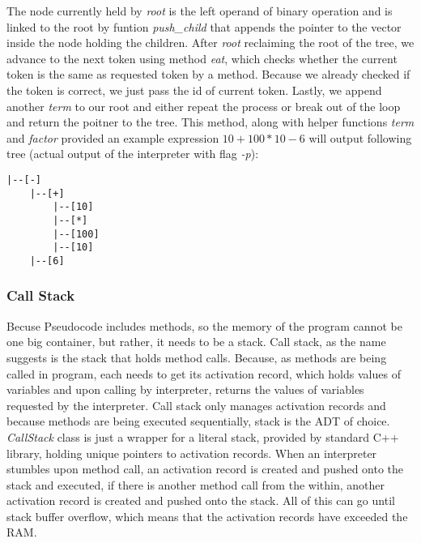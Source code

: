 \documentclass[12pt]{article}
\begin{document}
The node currently held by \emph{root} is the left operand of binary operation and is linked to the root
by funtion \emph{push\_child} that appends the pointer to the vector inside the node holding the children.
After \emph{root} reclaiming the root of the tree, we advance to the next token using method \emph{eat}, which
checks whether the current token is the same as requested token by a method. Because we already checked if the 
token is correct, we just pass the id of current token. Lastly, we append another \emph{term} to our root and
either repeat the process or break out of the loop and return the poitner to the tree. This method, along with 
helper functions \emph{term} and \emph{factor} provided an example expression $10 + 100 * 10 - 6$ will output
following tree (actual output of the interpreter with flag \emph{-p}):
\begin{verbatim}
|--[-]               
    |--[+]        
        |--[10]   
        |--[*]     
        |--[100]
        |--[10] 
    |--[6]        
\end{verbatim}
\subsubsection*{Call Stack}
Becuse Pseudocode includes methods, so the memory of the program cannot be one big container, but rather, it
needs to be a stack. Call stack, as the name suggests is the stack that holds method calls. Because, as methods
are being called in program, each needs to get its activation record, which holds values of variables and upon calling
by interpreter, returns the values of variables requested by the interpreter. Call stack only manages activation records
and because methods are being executed sequentially, stack is the ADT of choice. \emph{CallStack} class is just a wrapper
for a literal stack, provided by standard C++ library, holding unique pointers to activation records. When an interpreter 
stumbles upon method call, an activation record is created and pushed onto the stack and executed, if there is another
method call from the within, another activation record is created and pushed onto the stack. All of this can go until 
stack buffer overflow, which means that the activation records have exceeded the RAM. 
\end{document}
